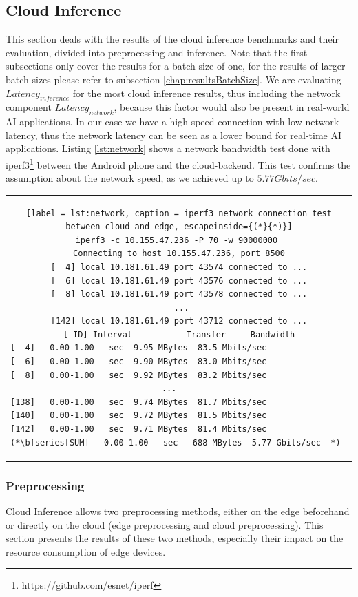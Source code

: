 \subsection{Cloud Inference}
\label{chap:CloudResults}
This section deals with the results of the cloud inference benchmarks and their evaluation, divided into preprocessing and inference.
Note that the first subsections only cover the results for a batch size of one, for the results of larger batch sizes please refer to subsection \ref{chap:resultsBatchSize}.
We are evaluating $Latency_{inference}$ for the most cloud inference results, thus including the network component $Latency_{network}$, because this factor would also be present in real-world AI applications. In our case we have a high-speed connection with low network latency, thus the network latency can be seen as a lower bound for real-time AI applications.
Listing \ref{lst:network} shows a network bandwidth test done with iperf3\footnote{https://github.com/esnet/iperf} between the Android phone and the cloud-backend. This test confirms the assumption about the network speed, as we achieved up to $5.77 Gbits/sec$.
\begin{center}
\begin{tabular}{c}
\begin{lstlisting}[label = lst:network, caption = iperf3 network connection test between cloud and edge, escapeinside={(*}{*)}]
iperf3 -c 10.155.47.236 -P 70 -w 90000000 
Connecting to host 10.155.47.236, port 8500
[  4] local 10.181.61.49 port 43574 connected to ...
[  6] local 10.181.61.49 port 43576 connected to ...
[  8] local 10.181.61.49 port 43578 connected to ...
 ...
[142] local 10.181.61.49 port 43712 connected to ...
[ ID] Interval           Transfer     Bandwidth
[  4]   0.00-1.00   sec  9.95 MBytes  83.5 Mbits/sec                  
[  6]   0.00-1.00   sec  9.90 MBytes  83.0 Mbits/sec                  
[  8]   0.00-1.00   sec  9.92 MBytes  83.2 Mbits/sec                  
 ...     
[138]   0.00-1.00   sec  9.74 MBytes  81.7 Mbits/sec                  
[140]   0.00-1.00   sec  9.72 MBytes  81.5 Mbits/sec                  
[142]   0.00-1.00   sec  9.71 MBytes  81.4 Mbits/sec                  
(*\bfseries[SUM]   0.00-1.00   sec   688 MBytes  5.77 Gbits/sec  *)  

\end{lstlisting}
\end{tabular}
\end{center}
\subsubsection{Preprocessing}
Cloud Inference allows two preprocessing methods, either on the edge beforehand or directly on the cloud (edge preprocessing and cloud preprocessing).
This section presents the results of these two methods, especially their impact on the resource consumption of edge devices.

